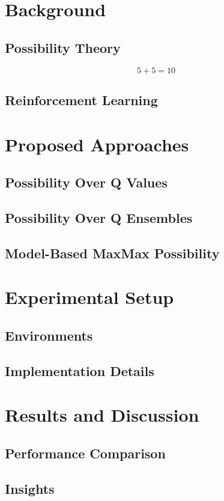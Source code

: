 \documentclass[11pt,a4paper]{report}
\begin{document}
\chapter{Background}
\section{Possibility Theory}
\begin{equation}
 5+5=10 
\end{equation}
\section{Reinforcement Learning}

\chapter{Proposed Approaches}
\section{Possibility Over Q Values}
\section{Possibility Over Q Ensembles}
\section{Model-Based MaxMax Possibility}

\chapter{Experimental Setup}
\section{Environments}
\section{Implementation Details}

\chapter{Results and Discussion}
\section{Performance Comparison}
\section{Insights}
\end{document}
